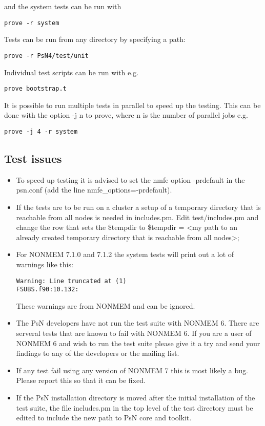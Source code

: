 and the system tests can be run with
\begin{verbatim}
prove -r system
\end{verbatim}

Tests can be run from any directory by specifying a path:
\begin{verbatim}
prove -r PsN4/test/unit
\end{verbatim}

Individual test scripts can be run with e.g. 
\begin{verbatim}
prove bootstrap.t
\end{verbatim}

It is possible to run multiple tests in parallel to speed up the testing. This can be done with the option -j n to prove, where n is the number of parallel jobs e.g.
\begin{verbatim}
prove -j 4 -r system
\end{verbatim}

\subsection{Test issues}
\begin{itemize}
	\item To speed up testing it is advised to set the nmfe option -prdefault in the psn.conf (add the line nmfe\_options=-prdefault).

	\item If the tests are to be run on a cluster a setup of a temporary directory that is reachable from all nodes is needed in includes.pm. Edit test/includes.pm and change the row that sets the \$tempdir to \$tempdir = <my path to an already created temporary directory that is reachable from all nodes>;

	\item For NONMEM 7.1.0 and 7.1.2 the system tests will print out a lot of warnings like this:
\begin{verbatim}
Warning: Line truncated at (1)
FSUBS.f90:10.132:
\end{verbatim}
These warnings are from NONMEM and can be ignored.
	\item	The PsN developers have not run the test suite with NONMEM 6. There are serveral tests that are known to fail with NONMEM 6. If you are a user of NONMEM 6 and wish to run the test suite please give it a try and send your findings to any of the developers or the mailing list.
	\item If any test fail using any version of NONMEM 7 this is most likely a bug. Please report this so that it can be fixed.
    \item If the PsN installation directory is moved after the initial installation of the test suite, the file includes.pm in the top level of the test directory
    must be edited to include the new path to PsN core and toolkit. 
\end{itemize} 

